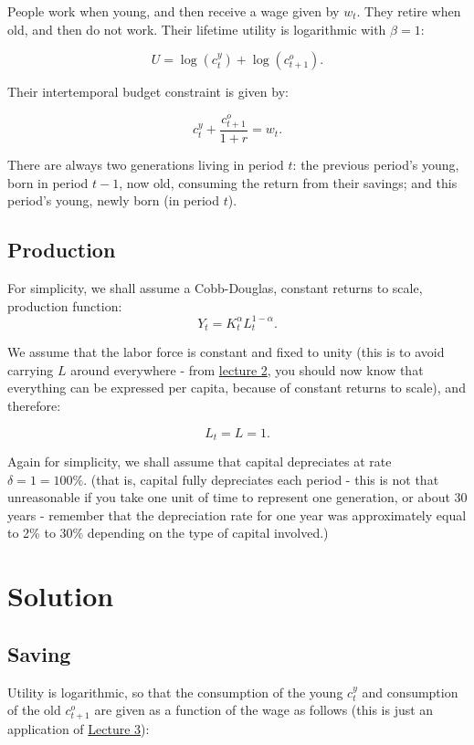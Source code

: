 \documentclass[]{book}
\theoremstyle{definition}
\theoremstyle{definition}
\theoremstyle{definition}
\theoremstyle{remark}
\begin{document}
People work when young, and then receive a wage given by \(w_{t}\). They
retire when old, and then do not work. Their lifetime utility is
logarithmic with \(\beta=1\):

\[U=\log(c_{t}^{y})+\log(c_{t+1}^{o}).\]

Their intertemporal budget constraint is given by:

\[c_{t}^{y}+\frac{c_{t+1}^{o}}{1+r}=w_{t}.\]

There are always two generations living in period \(t\): the previous
period's young, born in period \(t-1\), now old, consuming the return
from their savings; and this period's young, newly born (in period
\(t\)).

\subsection{Production}\label{production}

For simplicity, we shall assume a Cobb-Douglas, constant returns to
scale, production function: \[Y_{t}=K_{t}^{\alpha}L_{t}^{1-\alpha}.\]

We assume that the labor force is constant and fixed to unity (this is
to avoid carrying \(L\) around everywhere - from
\protect\hyperlink{solow}{lecture 2}, you should now know that
everything can be expressed per capita, because of constant returns to
scale), and therefore:

\[L_{t}=L=1.\]

Again for simplicity, we shall assume that capital depreciates at rate
\(\delta=1=100\%\). (that is, capital fully depreciates each period -
this is not that unreasonable if you take one unit of time to represent
one generation, or about 30 years - remember that the depreciation rate
for one year was approximately equal to 2\% to 30\% depending on the
type of capital involved.)

\section{Solution}\label{solution-1}

\subsection{Saving}\label{saving}

Utility is logarithmic, so that the consumption of the young
\(c_{t}^{y}\) and consumption of the old \(c_{t+1}^{o}\) are given as a
function of the wage as follows (this is just an application of
\protect\hyperlink{two-period}{Lecture 3}):
\end{document}
